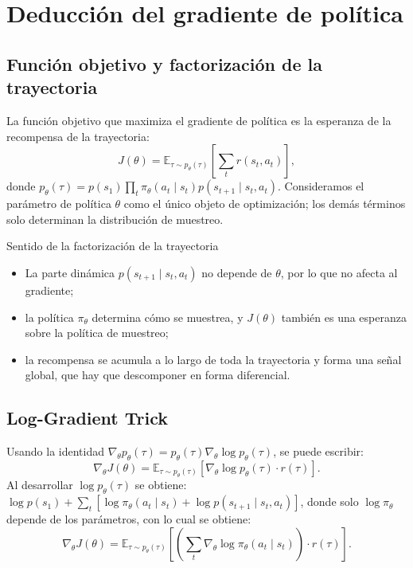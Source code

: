 \section{Deducción del gradiente de política}

\subsection{Función objetivo y factorización de la trayectoria}

La función objetivo que maximiza el gradiente de política es la esperanza de la recompensa de la trayectoria:
$$J(\theta) = \mathbb{E}_{\tau \sim p_\theta(\tau)} \left[ \sum_t r(s_t, a_t) \right],$$
donde $p_\theta(\tau) = p(s_1)\prod_t \pi_\theta(a_t\mid s_t)p(s_{t+1}\mid s_t,a_t)$. Consideramos el parámetro de política $\theta$ como el único objeto de optimización; los demás términos solo determinan la distribución de muestreo.

\begin{knowledgebox}{Sentido de la factorización de la trayectoria}
\begin{itemize}
    \item La parte dinámica $p(s_{t+1}\mid s_t,a_t)$ no depende de $\theta$, por lo que no afecta al gradiente;
    \item la política $\pi_\theta$ determina cómo se muestrea, y $J(\theta)$ también es una esperanza sobre la política de muestreo;
    \item la recompensa se acumula a lo largo de toda la trayectoria y forma una señal global, que hay que descomponer en forma diferencial.
\end{itemize}
\end{knowledgebox}

\subsection{Log-Gradient Trick}

Usando la identidad $\nabla_\theta p_\theta(\tau) = p_\theta(\tau) \nabla_\theta \log p_\theta(\tau)$, se puede escribir:
$$\nabla_\theta J(\theta) = \mathbb{E}_{\tau \sim p_\theta(\tau)} \left[ \nabla_\theta \log p_\theta(\tau) \cdot r(\tau) \right].$$
Al desarrollar $\log p_\theta(\tau)$ se obtiene: $\log p(s_1) + \sum_t \left[\log \pi_\theta(a_t\mid s_t) + \log p(s_{t+1}\mid s_t,a_t)\right]$,
donde solo $\log \pi_\theta$ depende de los parámetros, con lo cual se obtiene:
$$\nabla_\theta J(\theta) = \mathbb{E}_{\tau \sim p_\theta(\tau)} \left[ \left(\sum_t \nabla_\theta \log \pi_\theta(a_t\mid s_t)\right) \cdot r(\tau) \right].$$

